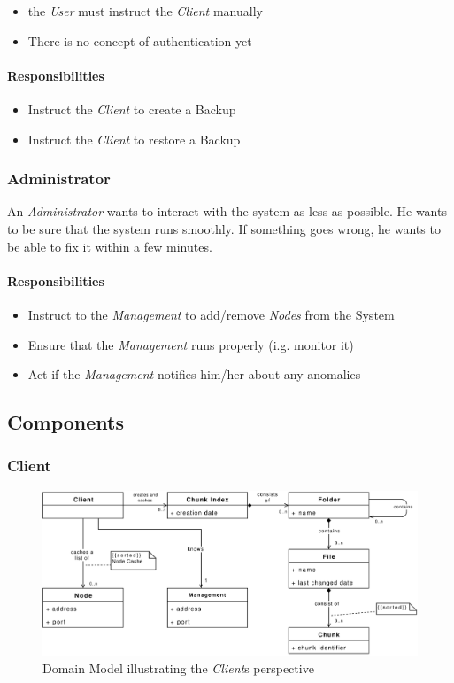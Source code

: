 \begin{itemize}
	\item the \emph{User} must instruct the \emph{Client} manually
	\item There is no concept of authentication yet
\end{itemize}

\paragraph{Responsibilities}
\begin{itemize}
	\item Instruct the \emph{Client} to create a Backup
	\item Instruct the \emph{Client} to restore a Backup
\end{itemize}


\subsubsection{Administrator}
An \emph{Administrator} wants to interact with the system as less as possible. He wants to be sure that the system runs smoothly. If something goes wrong, he wants to be able to fix it within a few minutes.

\paragraph{Responsibilities}
\begin{itemize}
	\item Instruct to the \emph{Management} to add/remove \emph{Nodes} from the System
	\item Ensure that the \emph{Management} runs properly (i.g. monitor it)
	\item Act if the \emph{Management} notifies him/her about any anomalies
\end{itemize}

\subsection{Components}

\subsubsection{Client}

\begin{figure}[h]
    \centering
    \includegraphics[width=1\linewidth]{resources/client_domain_model}
    \caption[Client Domain Model]{Domain Model illustrating the \emph{Client}s perspective}
\end{figure}

